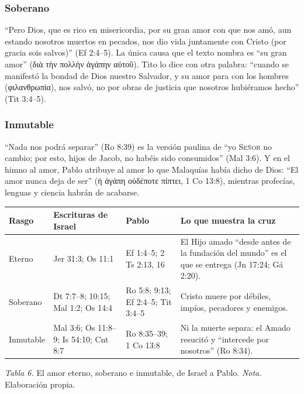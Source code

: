 \documentclass[11pt,letterpaper]{article}
\newcommand{\grc}[1]{\foreignlanguage{ancientgreek}{#1}}
\newcommand{\SENOR}{\textsc{Señor}}
\begin{document}
\subsubsection*{Soberano}
``Pero Dios, que es rico en misericordia, por su gran amor con que nos amó, aun estando nosotros muertos en pecados, nos dio vida juntamente con Cristo (por gracia sois salvos)'' (Ef 2:4--5). La única causa que el texto nombra es ``su gran amor'' (\grc{διὰ τὴν πολλὴν ἀγάπην αὐτοῦ}). Tito lo dice con otra palabra: ``cuando se manifestó la bondad de Dios nuestro Salvador, y su amor para con los hombres (\grc{φιλανθρωπία}), nos salvó, no por obras de justicia que nosotros hubiéramos hecho'' (Tit 3:4--5).

\subsubsection*{Inmutable}
``Nada nos podrá separar'' (Ro 8:39) es la versión paulina de ``yo \SENOR{} no cambio; por esto, hijos de Jacob, no habéis sido consumidos'' (Mal 3:6). Y en el himno al amor, Pablo atribuye al amor lo que Malaquías había dicho de Dios: ``El amor nunca deja de ser'' (\grc{ἡ ἀγάπη οὐδέποτε πίπτει}, 1 Co 13:8), mientras profecías, lenguas y ciencia habrán de acabarse.

\begin{center}\small\renewcommand{\arraystretch}{1.2}
\begin{tabular}{@{}L{2.2cm}L{4.2cm}L{4.2cm}L{4.2cm}@{}}
\toprule
\textbf{Rasgo} & \textbf{Escrituras de Israel} & \textbf{Pablo} & \textbf{Lo que muestra la cruz} \\ \midrule
Eterno & Jer 31:3; Os 11:1 & Ef 1:4--5; 2 Ts 2:13, 16 & El Hijo amado ``desde antes de la fundación del mundo'' es el que se entrega (Jn 17:24; Gá 2:20). \\
Soberano & Dt 7:7--8; 10:15; Mal 1:2; Os 14:4 & Ro 5:8; 9:13; Ef 2:4--5; Tit 3:4--5 & Cristo muere por débiles, impíos, pecadores y enemigos. \\
Inmutable & Mal 3:6; Os 11:8--9; Is 54:10; Cnt 8:7 & Ro 8:35--39; 1 Co 13:8 & Ni la muerte separa: el Amado resucitó y ``intercede por nosotros'' (Ro 8:34). \\
\bottomrule
\end{tabular}\par
{\footnotesize\color{gris}\textit{Tabla 6.} El amor eterno, soberano e inmutable, de Israel a Pablo. \textit{Nota.} Elaboración propia.}
\end{center}
\end{document}
